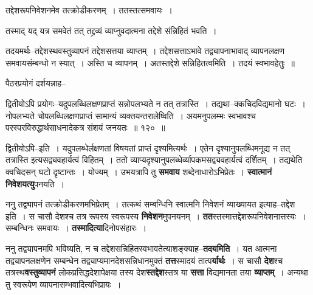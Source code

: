 \documentclass[article,12pt,a4paper]{memoir}
\begin{document}
	तद्देशरूपनिवेशनमेव तत्क्रोडीकरणम् । ततस्तत्समवायः ।  
	  
	तस्माद् यद् यत्र समवेतं तत् तद्द्रव्यं व्याप्नुवदात्मना तद्देशे संन्निहितं भवति ।  
	  
	तदयमर्थः--तद्देशस्थवस्तुव्यापनं तद्देशसत्तया व्याप्तम् । तद्देशसत्ताऽभावे तद्व्यापनाभावाद् व्यापनलक्षण समवायसंम्बन्धो न स्यात् । अस्ति च व्यापनम् । अतस्तद्देशे सन्निहितत्वमिति । तदयं स्वभावहेतुः ॥  
	  
	पैठरप्रयोगं दर्शयन्नाह--  
	  
	द्वितीयोऽपि प्रयोगः--यदुपलब्धिलक्षणप्राप्तं सन्नोपलभ्यते न तत् तत्रास्ति । तद्यथा--क्कचिदविद्यमानो घटः । नोपलभ्यते चोपलब्धिलक्षणप्राप्तं सामान्यं व्यक्तयन्तरालेष्विति । अयमनुपलम्भः स्वभावश्च परस्परविरुद्धार्थसाधनादेकत्र संशयं जनयतः ॥ १२० ॥ 
	  
	द्वितीयोऽपि--इति । यदुपलब्धेर्लक्षणतां विषयतां प्राप्तं दृश्यमित्यर्थः । एतेन दृश्यानुपलब्धिमनूद्य न तत् तत्रास्ति इत्यसद्व्यवहार्यत्वं विहितम् । ततो व्याप्यदृश्यानुपलब्धेर्व्यापकमसद्व्यवहार्यत्वं दर्शितम् । तद्यथेति क्वचिदसन् घटो दृष्टान्तः । योज्यम् । उभयत्रापि तु \textbf{समवाय}  शब्देनाधारोऽभिप्रेतः । \textbf{स्वात्मानं निवेशयत्यु}पनयति ।
	\pend
      

	  \pstart ननु तद्व्यापनं तत्क्रोडीकरणमभिप्रेतम् । तत्कथं सम्बन्धिनि स्वात्मनि निवेशनं व्याख्यायत इत्याह--तद्देश इति । स चासौ देशश्च तत्र रूपस्य स्वरूपस्य \textbf{निवेशन}मुपनयनम् । \textbf{तत}स्तस्मात्तद्देशरूपनिवेशनात्तस्यः । सम्बन्धिनः समवायः । \textbf{तस्मादित्या}दिनोपसंहारः ।
	\pend
      

	  \pstart ननु तद्व्यापनमपि भविष्यति, न च तद्देशसन्निहितस्वभावतेत्याशङ्क्याह--\textbf{तदयमिति} । यत आत्मना तद्व्यापनलक्षणेन सम्बन्धेन तद्व्याप्यमानदेशसन्निधानमुक्तं \textbf{तत्त}स्मादयं तात्प\textbf{र्यार्थः} । स चासौ \textbf{देश}श्च तत्रस्थ\textbf{वस्तुव्यापनं} लोकप्रसिद्धदेशापेक्षया तस्य देश\textbf{स्तद्देश}स्तत्र या \textbf{सत्ता} विद्यमानता तया \textbf{व्याप्तम्} । अन्यथा तु स्वरूपेण व्यापनासम्भवादित्यभिप्रायः ।
	\pend
      
\end{document}
